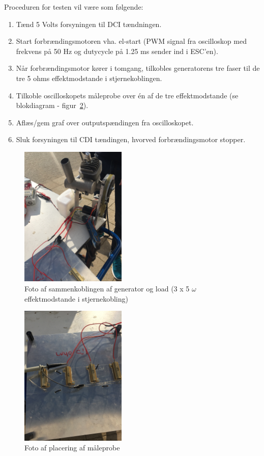 Proceduren for testen vil være som følgende:

\begin{enumerate}
\item Tænd 5 Volts forsyningen til DCI tændningen.
\item Start forbrændingsmotoren vha. el-start (PWM signal fra oscilloskop med frekvens på 50 Hz og dutycycle på 1.25 ms sender ind i ESC’en).
\item Når forbrændingsmotor kører i tomgang, tilkobles generatorens tre faser til de tre 5 ohms effektmodstande i stjernekoblingen.
\item Tilkoble oscilloskopets måleprobe over én af de tre effektmodstande (se blokdiagram - figur~\ref{fig:testsetup2}).
\item Aflæs/gem graf over outputspændingen fra oscilloskopet.
\item Sluk forsyningen til CDI tændingen, hvorved forbrændingsmotor stopper.
\end{enumerate}

\begin{figure}[h]
  \centering
  \includegraphics[width=0.45\textwidth]{testsetup2.JPG}
  \caption{Foto af sammenkoblingen af generator og load (3 x 5 $\omega$ effektmodstande i stjernekobling)}
  \label{fig:testsetup2}
\end{figure}

\begin{figure}[h]
  \centering
  \includegraphics[width=0.45\textwidth]{loadstjernekobling.JPG}
  \caption{Foto af placering af måleprobe}
  \label{fig:testsetup2}
\end{figure}


